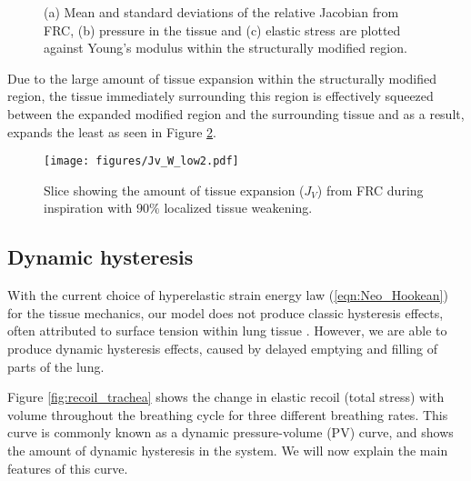 \begin{figure}[h]
  \centering
    \hspace*{0.1cm}
   \hspace*{0.1cm}
\caption{(a) Mean and standard deviations of the relative Jacobian from FRC, (b) pressure in the tissue and (c) elastic stress are plotted against Young's modulus within the structurally modified region.}
  \label{fig:constrict_errorbars}
\end{figure}
%
Due to the large amount of tissue expansion within the structurally modified region, the tissue immediately surrounding this region is effectively squeezed between the expanded modified region and the surrounding tissue and as a result, expands the least as seen in Figure \ref{fig:W_J}.
%
 \begin{figure}[h]
  \centering
 \texttt{[image: figures/Jv\_W\_low2.pdf]}
  \caption{Slice showing the amount of tissue expansion ($J_{V}$) from FRC during inspiration with $90\%$ localized tissue weakening.}
\label{fig:W_J}
\end{figure}
%

%
\subsection{Dynamic hysteresis}
With the current choice of hyperelastic strain energy law (\ref{eqn:Neo_Hookean}) for the tissue mechanics, our model does not produce classic hysteresis effects, often attributed to surface tension within lung tissue \cite{kowalczyk1994modelling}. However, we are able to produce dynamic hysteresis effects, caused by delayed emptying and filling of parts of the lung.

Figure \ref{fig:recoil_trachea} shows the change in elastic recoil (total stress) with volume throughout the breathing cycle for three different breathing rates. This curve is commonly known as a dynamic pressure-volume (PV) curve, and shows the amount of dynamic hysteresis in the system. We will now explain the main features of this curve.

